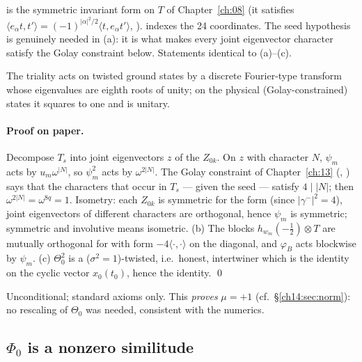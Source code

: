 \begin{dictionary}
 is the symmetric invariant form on $T$ of Chapter~\ref{ch:08} (it satisfies
$\langle e_\alpha t,t'\rangle=(-1)^{|\alpha|^2/2}\langle t,e_\alpha t'\rangle$, ).
 indexes the 24 coordinates.  The seed hypothesis is genuinely needed in (a): it is what makes
every joint eigenvector character satisfy the Golay constraint below.  Statements identical to (a)--(c).
\end{dictionary}
\begin{physics}
The triality acts on twisted ground states by a discrete Fourier-type transform whose eigenvalues are eighth roots of unity; on the physical (Golay-constrained) states it squares to one and is unitary.
\end{physics}


\paragraph{Proof on paper.}  Decompose $T_s$ into joint eigenvectors $z$ of the $Z_{0k}$.  On $z$ with
character $N$, $\psi_m$ acts by $u_m\omega^{|N|}$, so $\psi_m^2$ acts by $\omega^{2|N|}$.  The Golay constraint
of Chapter~\ref{ch:13} (, ) says that the characters that
occur in $T_s$ — given the seed — satisfy $4\mid|N|$; then $\omega^{2|N|}=\omega^{8q}=1$.  Isometry: each $Z_{0k}$
is symmetric for the form (since $|\gamma^-|^2=4$), joint eigenvectors of different characters are
orthogonal, hence $\psi_m$ is symmetric; symmetric and involutive means isometric.  (b) The blocks
$h_{w_m}(-\tfrac12)\otimes T$ are mutually orthogonal for  with form $-4\langle\cdot,\cdot\rangle$
on the diagonal, and $\varphi_B$ acts blockwise by $\psi_m$.  (c) $\Theta_0^2$ is a ($\sigma^2=1$)-twisted,
i.e.\ honest, intertwiner which is the identity on the cyclic vector $x_0(t_0)$, hence the identity. \qed

\begin{status}
Unconditional; standard axioms only.  This \emph{proves} $\mu=+1$ (cf.\ \S\ref{ch14:sec:norm}): no
rescaling of $\Theta_0$ was needed, consistent with the numerics.
\end{status}

\subsection{\texorpdfstring{$\Phi_0$ is a nonzero similitude}{Phi0 is a nonzero similitude}}

